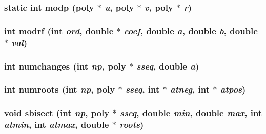 \subsubsection{\setlength{\rightskip}{0pt plus 5cm}static int modp ({\bf poly} $\ast$ {\em u}, {\bf poly} $\ast$ {\em v}, {\bf poly} $\ast$ {\em r})\hspace{0.3cm}{\tt  [static]}}\label{PSturm_8h_4e724ce035e3a8ce86b2a89079892189}


\subsubsection{\setlength{\rightskip}{0pt plus 5cm}int modrf (int {\em ord}, double $\ast$ {\em coef}, double {\em a}, double {\em b}, double $\ast$ {\em val})}\label{PSturm_8h_f4ddf1647fbd1e66b104b28152e62889}


\subsubsection{\setlength{\rightskip}{0pt plus 5cm}int numchanges (int {\em np}, {\bf poly} $\ast$ {\em sseq}, double {\em a})}\label{PSturm_8h_f1f0410bfe905c5bd852690cc2d22a94}


\subsubsection{\setlength{\rightskip}{0pt plus 5cm}int numroots (int {\em np}, {\bf poly} $\ast$ {\em sseq}, int $\ast$ {\em atneg}, int $\ast$ {\em atpos})}\label{PSturm_8h_ec7cf2f87a81026e9a56177d826bb06d}


\subsubsection{\setlength{\rightskip}{0pt plus 5cm}void sbisect (int {\em np}, {\bf poly} $\ast$ {\em sseq}, double {\em min}, double {\em max}, int {\em atmin}, int {\em atmax}, double $\ast$ {\em roots})}\label{PSturm_8h_6c18646bd5fbea2242e94311dfc5d0d3}


